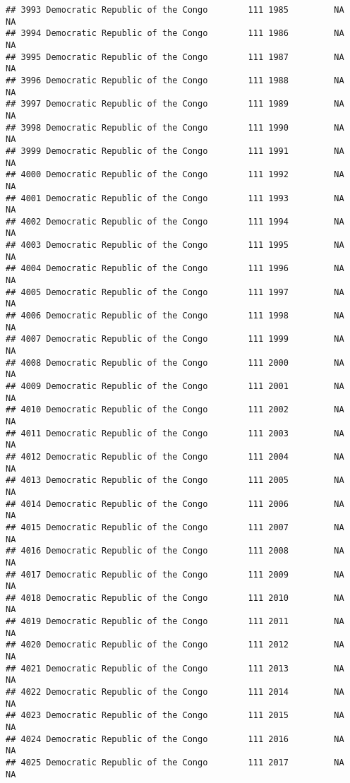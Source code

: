\documentclass[
]{article}
\begin{document}
\begin{verbatim}
## 3993 Democratic Republic of the Congo        111 1985         NA         NA
## 3994 Democratic Republic of the Congo        111 1986         NA         NA
## 3995 Democratic Republic of the Congo        111 1987         NA         NA
## 3996 Democratic Republic of the Congo        111 1988         NA         NA
## 3997 Democratic Republic of the Congo        111 1989         NA         NA
## 3998 Democratic Republic of the Congo        111 1990         NA         NA
## 3999 Democratic Republic of the Congo        111 1991         NA         NA
## 4000 Democratic Republic of the Congo        111 1992         NA         NA
## 4001 Democratic Republic of the Congo        111 1993         NA         NA
## 4002 Democratic Republic of the Congo        111 1994         NA         NA
## 4003 Democratic Republic of the Congo        111 1995         NA         NA
## 4004 Democratic Republic of the Congo        111 1996         NA         NA
## 4005 Democratic Republic of the Congo        111 1997         NA         NA
## 4006 Democratic Republic of the Congo        111 1998         NA         NA
## 4007 Democratic Republic of the Congo        111 1999         NA         NA
## 4008 Democratic Republic of the Congo        111 2000         NA         NA
## 4009 Democratic Republic of the Congo        111 2001         NA         NA
## 4010 Democratic Republic of the Congo        111 2002         NA         NA
## 4011 Democratic Republic of the Congo        111 2003         NA         NA
## 4012 Democratic Republic of the Congo        111 2004         NA         NA
## 4013 Democratic Republic of the Congo        111 2005         NA         NA
## 4014 Democratic Republic of the Congo        111 2006         NA         NA
## 4015 Democratic Republic of the Congo        111 2007         NA         NA
## 4016 Democratic Republic of the Congo        111 2008         NA         NA
## 4017 Democratic Republic of the Congo        111 2009         NA         NA
## 4018 Democratic Republic of the Congo        111 2010         NA         NA
## 4019 Democratic Republic of the Congo        111 2011         NA         NA
## 4020 Democratic Republic of the Congo        111 2012         NA         NA
## 4021 Democratic Republic of the Congo        111 2013         NA         NA
## 4022 Democratic Republic of the Congo        111 2014         NA         NA
## 4023 Democratic Republic of the Congo        111 2015         NA         NA
## 4024 Democratic Republic of the Congo        111 2016         NA         NA
## 4025 Democratic Republic of the Congo        111 2017         NA         NA

\end{verbatim}
\end{document}

